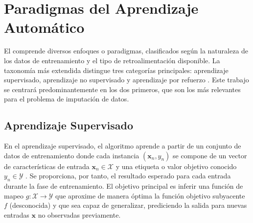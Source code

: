 \section{Paradigmas del Aprendizaje Automático}
\label{sec:ParadigmasML}
El  comprende diversos enfoques o paradigmas, clasificados según la naturaleza de los datos de entrenamiento y el tipo de retroalimentación disponible. La taxonomía más extendida distingue tres categorías principales: aprendizaje supervisado, aprendizaje no supervisado y aprendizaje por refuerzo \citep{Bishop2006}. Este trabajo se centrará predominantemente en los dos primeros, que son los más relevantes para el problema de imputación de datos.

\subsection{Aprendizaje Supervisado}
\label{subsec:Supervisado}
En el aprendizaje supervisado, el algoritmo aprende a partir de un conjunto de datos de entrenamiento donde cada instancia $(\mathbf{x}_n, y_n)$ se compone de un vector de características de entrada $\mathbf{x}_n \in \mathcal{X}$ y una etiqueta o valor objetivo conocido $y_n \in \mathcal{Y}$ \citep{Goodfellow2016, Hastie2009}. Se proporciona, por tanto, el resultado esperado para cada entrada durante la fase de entrenamiento. El objetivo principal es inferir una función de mapeo $g: \mathcal{X} \to \mathcal{Y}$ que aproxime de manera óptima la función objetivo subyacente $f$ (desconocida) y que sea capaz de generalizar, prediciendo la salida para nuevas entradas $\mathbf{x}$ no observadas previamente.

